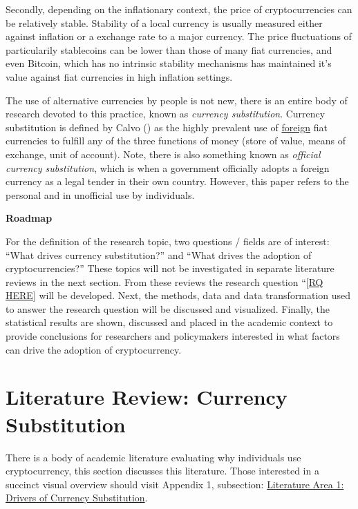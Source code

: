 \documentclass[
]{article}
\begin{document}
Secondly, depending on the inflationary context, the price of cryptocurrencies can be relatively stable. Stability of a local currency is usually measured either against inflation or a exchange rate to a major currency. The price fluctuations of particularily stablecoins can be lower than those of many fiat currencies, and even Bitcoin, which has no intrinsic stability mechanisms has maintained it's value against fiat currencies in high inflation settings.

The use of alternative currencies by people is not new, there is an entire body of research devoted to this practice, known as \emph{currency substitution}. Currency substitution is defined by Calvo () as the highly prevalent use of \ul{foreign} fiat currencies to fulfill any of the three functions of money (store of value, means of exchange, unit of account). Note, there is also something known as \emph{official currency substitution}, which is when a government officially adopts a foreign currency as a legal tender in their own country. However, this paper refers to the personal and in unofficial use by individuals.

\textbf{Roadmap}

For the definition of the research topic, two questions / fields are of interest: ``What drives currency substitution?'' and ``What drives the adoption of cryptocurrencies?'' These topics will not be investigated in separate literature reviews in the next section. From these reviews the research question ``{[}\ul{RQ HERE}{]} will be developed. Next, the methods, data and data transformation used to answer the research question will be discussed and visualized. Finally, the statistical results are shown, discussed and placed in the academic context to provide conclusions for researchers and policymakers interested in what factors can drive the adoption of cryptocurrency.

\newpage

\section{Literature Review: Currency Substitution}\label{literature-review-currency-substitution}

There is a body of academic literature evaluating why individuals use cryptocurrency, this section discusses this literature. Those interested in a succinct visual overview should visit Appendix 1, subsection: \hyperref[literature-area-1-drivers-of-currency-substitution]{Literature Area 1: Drivers of Currency Substitution}.
\end{document}
